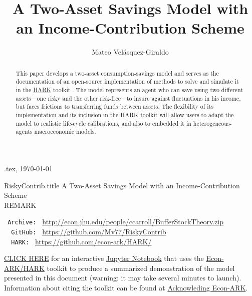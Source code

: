 \documentclass[./RiskyContrib.tex]{subfiles}
\begin{document}
\hfill{\tiny \texname.tex, \today}

\begin{verbatimwrite}{RiskyContrib.title}  %
A Two-Asset Savings Model with an Income-Contribution Scheme\\
REMARK
\end{verbatimwrite}

\title{A Two-Asset Savings Model with an Income-Contribution Scheme}

\author{Mateo Vel\'asquez-Giraldo}


\maketitle 

\hypertarget{abstract}{}
\begin{abstract}
This paper develops a two-asset consumption-savings model and serves as
the documentation of an open-source implementation of methods to solve and
simulate it in the \href{https://econ-ark.org/toolkit}{HARK}
toolkit \citep{carroll2018HARK}. The model represents an agent who can
save using two different assets---one risky and the other risk-free---to insure
against fluctuations in his income, but faces frictions to transferring funds between
assets. The flexibility of its implementation and its inclusion in the HARK
toolkit will allow users to adapt the model to realistic life-cycle calibrations, and
also to embedded it in heterogeneous-agents macroeconomic models.
\end{abstract}

\hypertarget{links}{}
\begin{small}
\parbox{\textwidth}{
\begin{center}
\begin{tabbing}
\texttt{~Archive:~} \= \= \url{http://econ.jhu.edu/people/ccarroll/BufferStockTheory.zip} \kill \\  %
\texttt{~~GitHub:~} \> \> \url{https://github.com/Mv77/RiskyContrib} \\
\texttt{~~HARK:~} \> \> \url{https://github.com/econ-ark/HARK/} \\
\end{tabbing}
\end{center}
          
\href{https://mybinder.org/v2/gh/Mv77/RiskyContrib/main?filepath=Code\%2FPython\%2FRiskyContrib.ipynb}{CLICK HERE}
for an interactive \href{https://en.wikipedia.org/wiki/Project\_Jupyter\#Jupyter_Notebook}{Jupyter Notebook} that
uses the \href{https://econ-ark/HARK}{Econ-ARK/HARK} toolkit to produce a summarized demonstration of the model
presented in this document (warning: it may take several minutes to launch).  Information about citing the toolkit can be found at \href{https://econ-ark.org/acknowledging/}{Acknowleding Econ-ARK}.
} %
\end{small}
\end{document}
